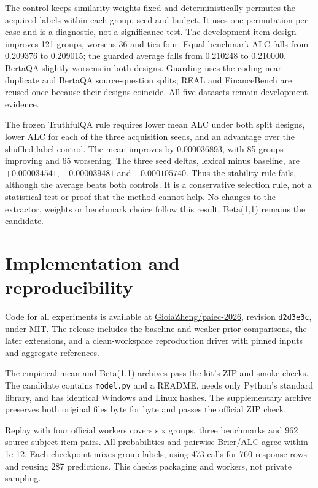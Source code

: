 \documentclass{article}
\begin{document}
The control keeps similarity weights fixed and deterministically permutes the acquired labels within each group, seed and budget. It uses one permutation per case and is a diagnostic, not a significance test. The development item design improves 121 groups, worsens 36 and ties four. Equal-benchmark ALC falls from 0.209376 to 0.209015; the guarded average falls from 0.210248 to 0.210000. BertaQA slightly worsens in both designs. Guarding uses the coding near-duplicate and BertaQA source-question splits; REAL and FinanceBench are reused once because their designs coincide. All five datasets remain development evidence.

The frozen TruthfulQA rule requires lower mean ALC under both split designs, lower ALC for each of the three acquisition seeds, and an advantage over the shuffled-label control. The mean improves by 0.000036893, with 85 groups improving and 65 worsening. The three seed deltas, lexical minus baseline, are \(+0.000034541\), \(-0.000039481\) and \(-0.000105740\). Thus the stability rule fails, although the average beats both controls. It is a conservative selection rule, not a statistical test or proof that the method cannot help. No changes to the extractor, weights or benchmark choice follow this result. Beta(1,1) remains the candidate.

\section{Implementation and reproducibility}\label{implementation-and-reproducibility}

Code for all experiments is available at \href{https://github.com/GioiaZheng/paiec-2026/tree/d2d3e3c1e803880f4918f2f8065616b513731a40}{GioiaZheng/paiec-2026}, revision \texttt{d2d3e3c}, under MIT. The release includes the baseline and weaker-prior comparisons, the later extensions, and a clean-workspace reproduction driver with pinned inputs and aggregate references.

The empirical-mean and Beta(1,1) archives pass the kit's ZIP and smoke checks. The candidate contains \texttt{model.py} and a README, needs only Python's standard library, and has identical Windows and Linux hashes. The supplementary archive preserves both original files byte for byte and passes the official ZIP check.

Replay with four official workers covers six groups, three benchmarks and 962 source subject-item pairs. All probabilities and pairwise Brier/ALC agree within 1e-12. Each checkpoint mixes group labels, using 473 calls for 760 response rows and reusing 287 predictions. This checks packaging and workers, not private sampling.
\end{document}
